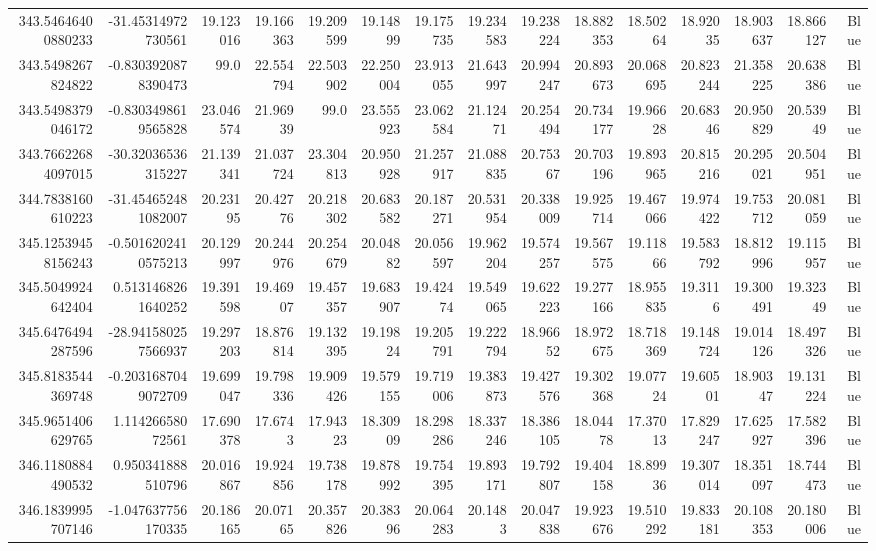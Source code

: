 \begin{center}
\begin{longtable}{rrrrrrrrrrrrrrr}
343.54646400880233 & -31.45314972730561 & 19.123016 & 19.166363 & 19.209599 & 19.14899 & 19.175735 & 19.234583 & 19.238224 & 18.882353 & 18.50264 & 18.92035 & 18.903637 & 18.866127 & Blue \\
343.5498267824822 & -0.8303920878390473 & 99.0 & 22.554794 & 22.503902 & 22.250004 & 23.913055 & 21.643997 & 20.994247 & 20.893673 & 20.068695 & 20.823244 & 21.358225 & 20.638386 & Blue \\
343.5498379046172 & -0.8303498619565828 & 23.046574 & 21.96939 & 99.0 & 23.555923 & 23.062584 & 21.12471 & 20.254494 & 20.734177 & 19.96628 & 20.68346 & 20.950829 & 20.53949 & Blue \\
343.76622684097015 & -30.32036536315227 & 21.139341 & 21.037724 & 23.304813 & 20.950928 & 21.257917 & 21.088835 & 20.75367 & 20.703196 & 19.893965 & 20.815216 & 20.295021 & 20.504951 & Blue \\
344.7838160610223 & -31.454652481082007 & 20.23195 & 20.42776 & 20.218302 & 20.683582 & 20.187271 & 20.531954 & 20.338009 & 19.925714 & 19.467066 & 19.974422 & 19.753712 & 20.081059 & Blue \\
345.12539458156243 & -0.5016202410575213 & 20.129997 & 20.244976 & 20.254679 & 20.04882 & 20.056597 & 19.962204 & 19.574257 & 19.567575 & 19.11866 & 19.583792 & 18.812996 & 19.115957 & Blue \\
345.5049924642404 & 0.5131468261640252 & 19.391598 & 19.46907 & 19.457357 & 19.683907 & 19.42474 & 19.549065 & 19.622223 & 19.277166 & 18.955835 & 19.3116 & 19.300491 & 19.32349 & Blue \\
345.6476494287596 & -28.941580257566937 & 19.297203 & 18.876814 & 19.132395 & 19.19824 & 19.205791 & 19.222794 & 18.96652 & 18.972675 & 18.718369 & 19.148724 & 19.014126 & 18.497326 & Blue \\
345.8183544369748 & -0.2031687049072709 & 19.699047 & 19.798336 & 19.909426 & 19.579155 & 19.719006 & 19.383873 & 19.427576 & 19.302368 & 19.07724 & 19.60501 & 18.90347 & 19.131224 & Blue \\
345.9651406629765 & 1.11426658072561 & 17.690378 & 17.6743 & 17.94323 & 18.30909 & 18.298286 & 18.337246 & 18.386105 & 18.04478 & 17.37013 & 17.829247 & 17.625927 & 17.582396 & Blue \\
346.1180884490532 & 0.950341888510796 & 20.016867 & 19.924856 & 19.738178 & 19.878992 & 19.754395 & 19.893171 & 19.792807 & 19.404158 & 18.89936 & 19.307014 & 18.351097 & 18.744473 & Blue \\
346.1839995707146 & -1.047637756170335 & 20.186165 & 20.07165 & 20.357826 & 20.38396 & 20.064283 & 20.1483 & 20.047838 & 19.923676 & 19.510292 & 19.833181 & 20.108353 & 20.180006 & Blue \\

\end{longtable}
\end{center}
